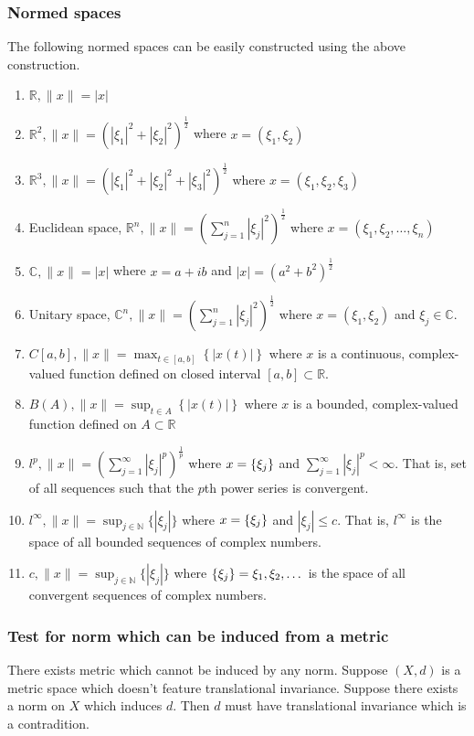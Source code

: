 \subsubsection{Normed spaces}
	The following normed spaces can be easily constructed using the above construction.
\begin{enumerate}
	\item $\mathbb{R}, \|x\| = |x|$
	\item $\mathbb{R}^2, \| x \| = \left( |\xi_1|^2 + |\xi_2|^2 \right)^\frac{1}{2} $ where $x = (\xi_1,\xi_2)$
	\item $\mathbb{R}^3, \| x \|= \left( |\xi_1|^2 + |\xi_2|^2 + |\xi_3|^2 \right)^\frac{1}{2} $ where $x = (\xi_1,\xi_2,\xi_3)$
	\item Euclidean space, $\displaystyle \mathbb{R}^n, \| x \| = \left( \sum_{j=1}^n |\xi_j|^2 \right)^\frac{1}{2}$ where $x = (\xi_1,\xi_2,\dots,\xi_n)$
	\item $\mathbb{C}, \| x \| = |x|$ where $x = a+ib$ and $|x| = (a^2+b^2)^\frac{1}{2}$
	\item Unitary space, $\displaystyle \mathbb{C}^n, \| x \| =  \left( \sum_{j=1}^n |\xi_j|^2 \right)^\frac{1}{2}$ where  $x = (\xi_1,\xi_2)$ and $\xi_j \in \mathbb{C}$.
	\item $\displaystyle C[a,b], \| x \| = \max_{t \in [a,b]} \left\{ |x(t)| \right\}$ where $x$ is a continuous, complex-valued function defined on closed interval $[a,b] \subset \mathbb{R}$.
	\item $\displaystyle B(A), \| x \| = \sup_{t \in A} \left\{ |x(t)| \right\}$ where $x$ is a bounded, complex-valued function defined on $A \subset \mathbb{R}$
	\item $\displaystyle l^p, \| x \| = \left( \sum_{j = 1}^\infty |\xi_j|^p \right)^\frac{1}{p}$ where $x = \left\{\xi_j\right\}$ and $\displaystyle \sum_{j=1}^\infty |\xi_j|^p < \infty$. That is, set of all sequences such that the $p$th power series is convergent.
	\item $\displaystyle l^\infty, \| x \| = \sup_{j \in \mathbb{N}} \{ |\xi_j| \} $ where $x = \left\{\xi_j\right\}$ and $|\xi_j| \le c$. That is, $l^\infty$ is the space of all bounded sequences of complex numbers.
	\item $\displaystyle c, \| x \| = \sup_{j \in \mathbb{N}} \{ |\xi_j| \}$ where $\left\{\xi_j\right\} = \xi_1,\xi_2,\dotsc$ is the space of all convergent sequences of complex numbers.
\end{enumerate}

\subsubsection{Test for norm which can be induced from a metric}
	There exists metric which cannot be induced by any norm.
	Suppose $(X,d)$ is a metric space which doesn't feature translational invariance.
	Suppose there exists a norm on $X$ which induces $d$.
	Then $d$ must have translational invariance which is a contradition.\\

